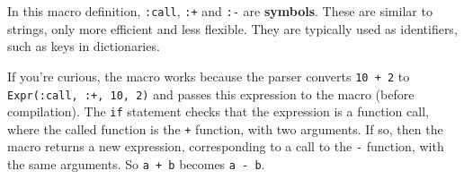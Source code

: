 \documentclass[11pt]{article}
\begin{document}
    In this macro definition, \texttt{:call}, \texttt{:+} and \texttt{:-}
are \textbf{symbols}. These are similar to strings, only more efficient
and less flexible. They are typically used as identifiers, such as keys
in dictionaries.

    If you're curious, the macro works because the parser converts
\texttt{10\ +\ 2} to \texttt{Expr(:call,\ :+,\ 10,\ 2)} and passes this
expression to the macro (before compilation). The \texttt{if} statement
checks that the expression is a function call, where the called function
is the \texttt{+} function, with two arguments. If so, then the macro
returns a new expression, corresponding to a call to the \texttt{-}
function, with the same arguments. So \texttt{a\ +\ b} becomes
\texttt{a\ -\ b}.


    
    
    
\end{document}
